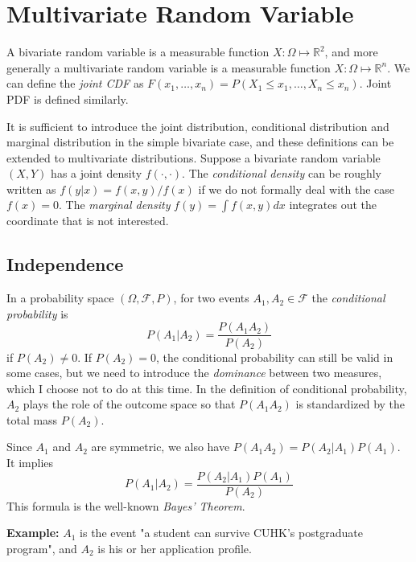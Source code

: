 \documentclass[11pt]{article}
\begin{document}
    \section{Multivariate Random
Variable}\label{multivariate-random-variable}

A bivariate random variable is a measurable function
\(X:\Omega\mapsto\mathbb{R}^{2}\), and more generally a multivariate
random variable is a measurable function
\(X:\Omega\mapsto\mathbb{R}^{n}\). We can define the \emph{joint CDF} as
\(F\left(x_{1},\ldots,x_{n}\right)=P\left(X_{1}\leq x_{1},\ldots,X_{n}\leq x_{n}\right)\).
Joint PDF is defined similarly.

It is sufficient to introduce the joint distribution, conditional
distribution and marginal distribution in the simple bivariate case, and
these definitions can be extended to multivariate distributions. Suppose
a bivariate random variable \((X,Y)\) has a joint density
\(f(\cdot,\cdot)\). The \emph{conditional density} can be roughly
written as \(f\left(y|x\right)=f\left(x,y\right)/f\left(x\right)\) if we
do not formally deal with the case \(f(x)=0\). The \emph{marginal
density} \(f\left(y\right)=\int f\left(x,y\right)dx\) integrates out the
coordinate that is not interested.

    \subsection{Independence}\label{independence}

In a probability space \((\Omega, \mathcal{F}, P)\), for two events
\(A_1,A_2\in \mathcal{F}\) the \emph{conditional probability} is
\[P\left(A_1|A_2\right)=\frac{P\left(A_1 A_2\right)}{P\left(A_2\right)}\]
if \(P(A_2) \neq 0\). If \(P(A_2) =0\), the conditional probability can
still be valid in some cases, but we need to introduce the
\emph{dominance} between two measures, which I choose not to do at this
time. In the definition of conditional probability, \(A_2\) plays the
role of the outcome space so that \(P(A_1 A_2)\) is standardized by the
total mass \(P(A_2)\).

Since \(A_1\) and \(A_2\) are symmetric, we also have
\(P(A_1 A_2) = P(A_2|A_1)P(A_1)\). It implies
\[P(A_1 | A_2)=\frac{P\left(A_2| A_1\right)P\left(A_1\right)}{P\left(A_2\right)}\]
This formula is the well-known \emph{Bayes' Theorem}.

\textbf{Example:} \(A_1\) is the event "a student can survive CUHK's
postgraduate program", and \(A_2\) is his or her application profile.
\end{document}

